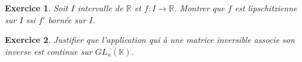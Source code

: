 \documentclass[12pt,a4paper]{article}
\newcommand{\R}{\mathbb{R}}
\newcommand{\C}{\mathbb{C}}
\newcommand{\K}{\mathbb{K} }
\theoremstyle{break}
\theoremstyle{break}
\newtheorem{Exo}{Exercice}
\begin{document}
%

\begin{Exo}
		 Soit $I$ intervalle de $\R$ et $f:I\to \R$. Montrer que $f$ est lipschitzienne sur $I$ ssi $f'$  bornée sur $I$.
\end{Exo}

%

\begin{Exo}
	Justifier que l'application qui à une matrice inversible associe son inverse est continue sur $GL_n(\K)$.
\end{Exo}

	
\end{document}
